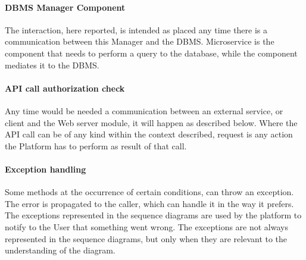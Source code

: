\paragraph*{DBMS Manager Component}
The interaction, here reported, is intended as placed any time there is a communication between this Manager and the DBMS.
Microservice is the component that needs to perform a query to the database, while the component mediates it to the DBMS.
\paragraph*{API call authorization check} \label{reff:authcheck}
Any time would be needed a communication between an external service, or client and the Web server module, it will happen as described below.
Where the API call can be of any kind within the context described, request is any action the Platform has to perform as result of that call.
\paragraph*{Exception handling}
Some methods at the occurrence of certain conditions, can throw an exception. The error is propagated to the caller, which can handle it in the way it prefers. The exceptions represented in the sequence diagrams are used by the platform to notify
to the User that something went wrong. The exceptions are not always represented in the sequence diagrams, but only when they are relevant to the understanding of the diagram.

